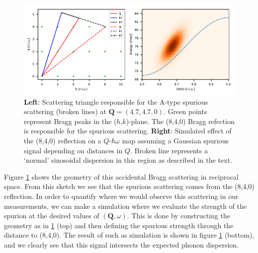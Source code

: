 \begin{figure}
    \centering
    \includegraphics[width=\textwidth]{fig/anomaly/spurion.pdf}
    \caption{\textbf{Left}: Scattering triangle responsible for the A-type spurious scattering (broken lines) at $\bm{Q} = (4.7,4.7,0)$. Green points represent Bragg peaks in the ($h$,$k$)-plane. The (8,4,0) Bragg refection is responsible for the spurious scattering. \textbf{Right}: Simulated effect of the (8,4,0) reflection on a $Q$-$\hbar\omega$ map assuming a Gaussian spurious signal depending on distances in $Q$. Broken line represents a `normal' sinosoidal dispersion in this region as described in the text.}
    \label{fig:in8_spurion}
\end{figure}

Figure \ref{fig:in8_spurion} shows the geometry of this accidental Bragg scattering in reciprocal space. From this sketch we see that the spurious scattering comes from the (8,4,0) reflection. In order to quantify where we would observe this scattering in our measurements, we can make a simulation where we evaluate the strength of the spurion at the desired values of $(\bm{Q}, \omega)$. This is done by constructing the geometry as in \ref{fig:in8_spurion} (top) and then defining the spurious strength through the distance to (8,4,0). The result of such as simulation is shown in figure \ref{fig:in8_spurion} (bottom), and we clearly see that this signal intersects the expected phonon dispersion.

